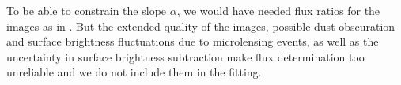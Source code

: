To be able to constrain the slope $\alpha$, we would have needed flux ratios for the images as in \citet{GlennEC}. But the extended quality of the images, possible dust obscuration and surface brightness fluctuations due to microlensing events, as well as the uncertainty in surface brightness subtraction make flux determination too unreliable and we do not include them in the fitting.